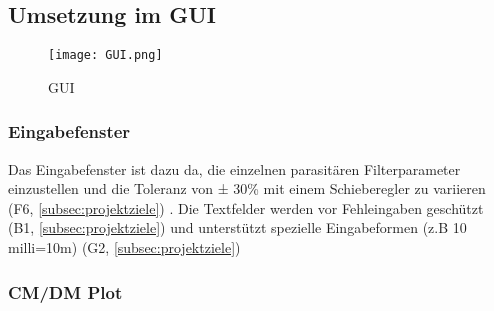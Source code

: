 



\subsection{Umsetzung im GUI}\label{subsec:umsetzungimgui}

\begin{figure}[H]
	\centering
	\texttt{[image: GUI.png]}
	\caption{GUI}
	\label{fig:GUI}
\end{figure}

\subsubsection{Eingabefenster} \label{subsubsec:eingabefenster}

Das Eingabefenster ist dazu da, die einzelnen parasitären Filterparameter einzustellen und die Toleranz von ± 30\% mit einem Schieberegler zu variieren (F6,  \ref{subsec:projektziele}) . Die  Textfelder werden vor Fehleingaben geschützt (B1,  \ref{subsec:projektziele}) und unterstützt spezielle Eingabeformen (z.B 10 milli=10m) (G2,  \ref{subsec:projektziele})

\subsubsection{CM/DM Plot} \label{subsubsec:CM_DMplot}

